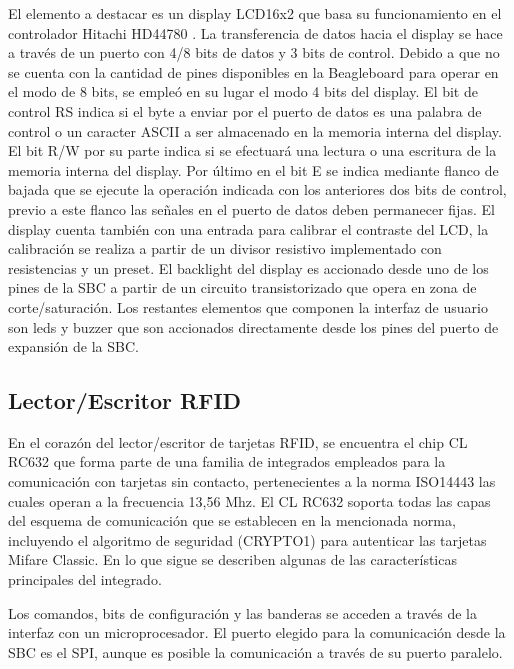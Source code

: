 \bigskip
\bigskip
{}

El elemento a destacar es un display LCD16x2 que basa su funcionamiento en el controlador Hitachi HD44780 \cite{dpy}. La transferencia de datos hacia el display se hace a través de un puerto con 4/8 bits de datos y 3 bits de control. Debido a que no se cuenta con la cantidad de pines disponibles en la Beagleboard para operar en el modo de 8 bits, se empleó en su lugar el modo 4 bits del display. El bit de control RS indica si el byte a enviar por el puerto de datos es una palabra de control o un caracter ASCII a ser almacenado en la memoria interna del display. El bit R/W por su parte indica si se efectuará una lectura o una escritura de la memoria interna del display. Por último en el bit E se indica mediante flanco de bajada que se ejecute la operación indicada con los anteriores dos bits de control, previo a este flanco las señales en el puerto de datos deben permanecer fijas.
El display cuenta también con una entrada para calibrar el contraste del LCD, la calibración se realiza a partir de un divisor resistivo implementado con resistencias y un preset.
El backlight del display es accionado desde uno de los pines de la SBC a partir de un circuito transistorizado que opera en zona de corte/saturación.
Los restantes elementos que componen la interfaz de usuario son leds y buzzer que son accionados directamente desde los pines del puerto de expansión de la SBC.

\subsection{Lector/Escritor RFID}
En el corazón del lector/escritor de tarjetas RFID, se encuentra el chip CL RC632 que forma parte de una familia de integrados empleados para la comunicación con tarjetas sin contacto, pertenecientes a la norma ISO14443 las cuales operan a la frecuencia 13,56 Mhz.
El CL RC632 soporta todas las capas del esquema de comunicación que se establecen en la mencionada norma, incluyendo el algoritmo de seguridad (CRYPTO1) para autenticar las tarjetas Mifare Classic. En lo que sigue se describen algunas de las características principales del integrado.

\bigskip
{}

Los comandos, bits de configuración y las banderas se acceden a través de la interfaz con un microprocesador. El puerto elegido para la comunicación desde la SBC es el SPI, aunque es posible la comunicación a través de su puerto paralelo. 


